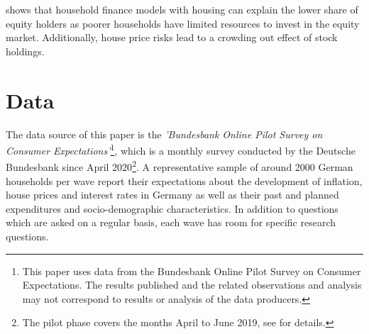 \documentclass[ProjectABM]{subfiles}
\begin{document}
\cite{cocco2005housing} shows that household finance models with housing can explain the lower share of equity holders as poorer households have limited resources to invest in the equity market. Additionally, house price risks lead to a crowding out effect of stock holdings.







\section{Data}\label{sec:data}

The data source of this paper is the \textit{'Bundesbank Online Pilot Survey on Consumer Expectations'}\footnote{This paper uses data from the Bundesbank Online Pilot Survey on Consumer Expectations. The results published and the related observations and analysis may not correspond to results or analysis of the data producers.}, which is a monthly survey conducted by the Deutsche Bundesbank since April 2020\footnote{The pilot phase covers the months April to June 2019, see \cite{bundesbank_2020} for details.}. A representative sample of around 2000 German households per wave report their expectations about the development of inflation, house prices and interest rates in Germany as well as their past and planned expenditures and socio-demographic characteristics. In addition to questions which are asked on a regular basis, each wave has room for specific research questions.
\end{document}
